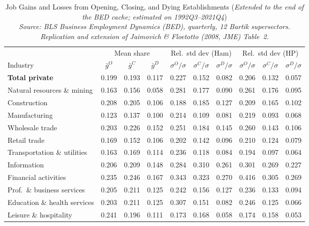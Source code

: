 \begin{table}[htbp]
\centering
\small
\caption{Job Gains and Losses from Opening, Closing, and Dying Establishments (\emph{Extended to the end of the BED cache; estimated on 1992Q3--2021Q4}) \\[2pt]
  {\small\itshape Source: BLS Business Employment Dynamics (BED), quarterly, 12 Bartik supersectors. Replication and extension of Jaimovich \& Floetotto (2008, JME) Table~2.}}
\label{tab:jf_t2_ext_2024}
\begin{tabular}{lccccccccc}
\toprule
 & \multicolumn{3}{c}{Mean share} & \multicolumn{3}{c}{Rel.\ std dev (Ham)} & \multicolumn{3}{c}{Rel.\ std dev (HP)} \\
\cmidrule(lr){2-4}\cmidrule(lr){5-7}\cmidrule(lr){8-10}
Industry & $\bar{g}^O$ & $\bar{g}^C$ & $\bar{g}^D$ & $\sigma^O/\sigma$ & $\sigma^C/\sigma$ & $\sigma^D/\sigma$ & $\sigma^O/\sigma$ & $\sigma^C/\sigma$ & $\sigma^D/\sigma$ \\
\midrule
\midrule
\textbf{Total private} & 0.199 & 0.193 & 0.117 & 0.227 & 0.152 & 0.082 & 0.206 & 0.132 & 0.057 \\
Natural resources \& mining & 0.163 & 0.156 & 0.058 & 0.281 & 0.177 & 0.090 & 0.261 & 0.176 & 0.095 \\
Construction & 0.208 & 0.205 & 0.106 & 0.188 & 0.185 & 0.127 & 0.209 & 0.165 & 0.102 \\
Manufacturing & 0.123 & 0.137 & 0.100 & 0.214 & 0.109 & 0.081 & 0.219 & 0.093 & 0.068 \\
Wholesale trade & 0.203 & 0.226 & 0.152 & 0.251 & 0.184 & 0.145 & 0.260 & 0.143 & 0.106 \\
Retail trade & 0.169 & 0.152 & 0.106 & 0.202 & 0.142 & 0.096 & 0.210 & 0.124 & 0.079 \\
Transportation \& utilities & 0.163 & 0.169 & 0.114 & 0.236 & 0.118 & 0.084 & 0.194 & 0.097 & 0.064 \\
Information & 0.206 & 0.209 & 0.148 & 0.284 & 0.310 & 0.261 & 0.301 & 0.269 & 0.227 \\
Financial activities & 0.235 & 0.246 & 0.167 & 0.343 & 0.323 & 0.270 & 0.416 & 0.305 & 0.269 \\
Prof.~\& business services & 0.205 & 0.211 & 0.125 & 0.242 & 0.156 & 0.127 & 0.236 & 0.133 & 0.094 \\
Education \& health services & 0.203 & 0.211 & 0.125 & 0.307 & 0.151 & 0.082 & 0.246 & 0.125 & 0.066 \\
Leisure \& hospitality & 0.241 & 0.196 & 0.111 & 0.173 & 0.168 & 0.058 & 0.174 & 0.158 & 0.053 \\

\end{tabular}
\end{table}
